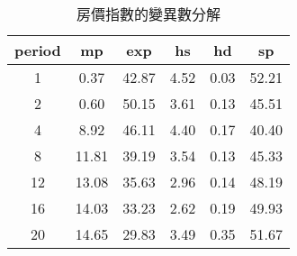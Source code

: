 \begin{table}[h]
\centering
\begin{tabular}{cccccc}
  \hline
period & mp & exp & hs & hd & sp \\ 
  \hline
1 & 0.37 & 42.87 & 4.52 & 0.03 & 52.21 \\ 
   \hline
2 & 0.60 & 50.15 & 3.61 & 0.13 & 45.51 \\ 
   \hline
4 & 8.92 & 46.11 & 4.40 & 0.17 & 40.40 \\ 
   \hline
8 & 11.81 & 39.19 & 3.54 & 0.13 & 45.33 \\ 
   \hline
12 & 13.08 & 35.63 & 2.96 & 0.14 & 48.19 \\ 
   \hline
16 & 14.03 & 33.23 & 2.62 & 0.19 & 49.93 \\ 
   \hline
20 & 14.65 & 29.83 & 3.49 & 0.35 & 51.67 \\ 
   \hline
\end{tabular}
\caption{房價指數的變異數分解} 
\end{table}

